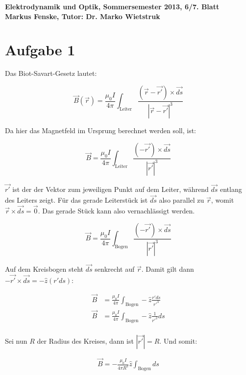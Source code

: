 \documentclass[a4paper,german,12pt,smallheadings]{scrartcl}
\begin{document}
\begin{center}
\bfseries %
\sffamily %
\vspace{-40pt}
Elektrodynamik und Optik, Sommersemester 2013, 6/7. Blatt \\
Markus Fenske, Tutor: Dr. Marko Wietstruk
\vspace{-10pt}
\end{center}
\section*{Aufgabe 1}
Das Biot-Savart-Gesetz lautet:

\begin{equation}
  \vec{B}(\vec{r}) = \frac{\mu_0 I}{4 \pi} \int_{\text{Leiter}} \frac{(\vec{r} - \vec{r'}) \times \vec{ds}}{|\vec{r}-\vec{r'}|^3}
\end{equation}

Da hier das Magnetfeld im Ursprung berechnet werden soll, ist:


\begin{equation}
  \vec{B} = \frac{\mu_0 I}{4 \pi} \int_{\text{Leiter}} \frac{(-\vec{r'}) \times \vec{ds}}{|\vec{r'}|^3}
\end{equation}

$\vec{r'}$ ist der der Vektor zum jeweiligen Punkt auf dem Leiter, während
$\vec{ds}$ entlang des Leiters zeigt. Für das gerade Leiterstück ist $\vec{ds}$
also parallel zu $\vec{r}$, womit $\vec{r} \times \vec{ds} = \vec{0}$. Das
gerade Stück kann also vernachlässigt werden.

\begin{equation}
  \vec{B} = \frac{\mu_0 I}{4 \pi} \int_{\text{Bogen}} \frac{(-\vec{r'}) \times \vec{ds}}{|\vec{r'}|^3}
\end{equation}

Auf dem Kreisbogen steht $\vec{ds}$ senkrecht auf $\vec{r}$. Damit gilt dann
$-\vec{r'} \times \vec{ds} = -\widehat{z} (r' ds)$:

\begin{align}
  \vec{B} &= \frac{\mu_0 I}{4 \pi} \int_{\text{Bogen}} -\widehat{z} \frac{r' ds}{r'^3} \\
  \vec{B} &= \frac{\mu_0 I}{4 \pi} \int_{\text{Bogen}} -\widehat{z} \frac{1}{r'^2} ds \\
\end{align}

Sei nun $R$ der Radius des Kreises, dann ist $|\vec{r'}| = R$. Und somit:

\begin{align}
  \vec{B} = -\frac{\mu_0 I}{4 \pi R^2} \widehat{z}\int_{\text{Bogen}} ds \\
\end{align}
\end{document}
